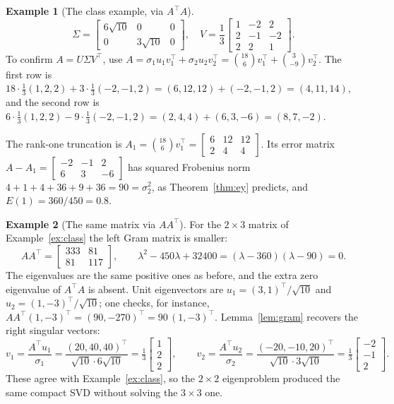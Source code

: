 \documentclass[12pt,a4paper]{report}
\newcommand{\T}{^{\top}}
\theoremstyle{plain}
\theoremstyle{definition}
\theoremstyle{remark}
\theoremstyle{definition}
\newtheorem{example}{Example}[chapter]
\begin{document}
\begin{example}[The class example, via $A\T A$]
\[\Sigma=\begin{bmatrix}6\sqrt{10}&0&0\\0&3\sqrt{10}&0\end{bmatrix},\quad
V=\frac13\begin{bmatrix}1&-2&2\\2&-1&-2\\2&2&1\end{bmatrix}.
\]
To confirm $A=U\Sigma V\T$, use $A=\sigma_1u_1v_1\T+\sigma_2u_2v_2\T=\binom{18}{6}v_1\T+\binom{3}{-9}v_2\T$. The first row is
$18\cdot\tfrac13(1,2,2)+3\cdot\tfrac13(-2,-1,2)=(6,12,12)+(-2,-1,2)=(4,11,14)$,
and the second row is
$6\cdot\tfrac13(1,2,2)-9\cdot\tfrac13(-2,-1,2)=(2,4,4)+(6,3,-6)=(8,7,-2)$.

The rank-one truncation is $A_1=\binom{18}{6}v_1\T=\begin{bmatrix}6&12&12\\2&4&4\end{bmatrix}$. Its error matrix $A-A_1=\begin{bmatrix}-2&-1&2\\6&3&-6\end{bmatrix}$ has squared Frobenius norm $4+1+4+36+9+36=90=\sigma_2^2$, as Theorem~\ref{thm:ey} predicts, and $E(1)=360/450=0.8$.
\end{example}

\begin{example}[The same matrix via $AA\T$]\label{ex:left}
For the $2\times3$ matrix of Example~\ref{ex:class} the left Gram matrix is smaller:
\[
AA\T=\begin{bmatrix}333&81\\81&117\end{bmatrix},\qquad \lambda^2-450\lambda+32400=(\lambda-360)(\lambda-90)=0 .
\]
The eigenvalues are the same positive ones as before, and the extra zero eigenvalue of $A\T A$ is absent. Unit eigenvectors are $u_1=(3,1)\T/\sqrt{10}$ and $u_2=(1,-3)\T/\sqrt{10}$; one checks, for instance, $AA\T(1,-3)\T=(90,-270)\T=90\,(1,-3)\T$. Lemma~\ref{lem:gram} recovers the right singular vectors:
\[
v_1=\frac{A\T u_1}{\sigma_1}=\frac{(20,40,40)\T}{\sqrt{10}\cdot6\sqrt{10}}=\tfrac13\begin{bmatrix}1\\2\\2\end{bmatrix},\qquad
v_2=\frac{A\T u_2}{\sigma_2}=\frac{(-20,-10,20)\T}{\sqrt{10}\cdot3\sqrt{10}}=\tfrac13\begin{bmatrix}-2\\-1\\2\end{bmatrix}.
\]
These agree with Example~\ref{ex:class}, so the $2\times2$ eigenproblem produced the same compact SVD without solving the $3\times3$ one.
\end{example}
\end{document}
